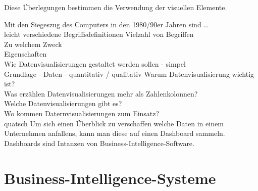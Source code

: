 Diese Überlegungen bestimmen die Verwendung der visuellen Elemente. 


\clearpage
Mit den Siegeszug des Computers in den 1980/90er Jahren sind \dots\\
leicht verschiedene Begriffsdefinitionen
Vielzahl von Begriffen\\ 
Zu welchem Zweck\\
Eigenschaften\\
Wie Datenvisualisierungen gestaltet werden sollen - simpel\\
Grundlage - Daten - quantitativ / qualitativ
Warum Datenvisualisierung wichtig ist?\\
Was erzählen Datenvisualisierungen mehr als Zahlenkolonnen?\\
Welche Datenvisualisierungen gibt es?\\
Wo kommen Daternvisualisierungen zum Einsatz?\\
quatsch
Um sich einen Überblick zu verschaffen welche Daten in einem Unternehmen anfallens, kann man diese auf einen Dashboard sammeln.
Dashboards sind Intanzen von Business-Intelligence-Software.





\clearpage
\section{Business-Intelligence-Systeme}

